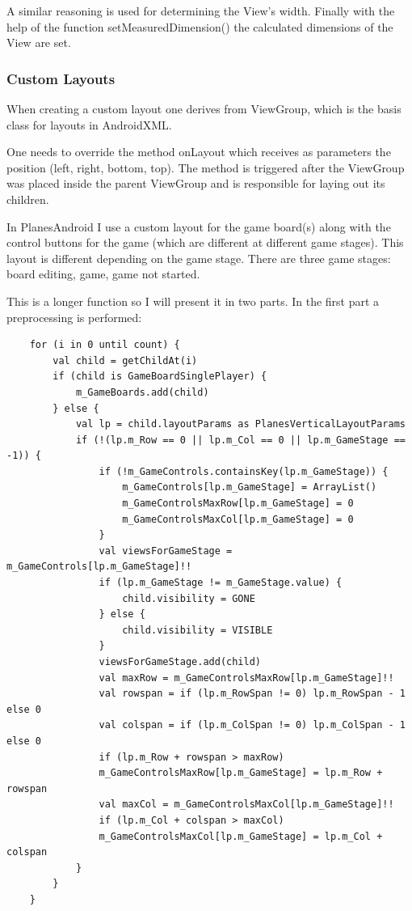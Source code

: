 A similar reasoning is used for determining the View's width. Finally with the help of the function setMeasuredDimension() the calculated dimensions of the View are set.

\subsubsection {Custom Layouts} \label{custom_layouts}

When creating a custom layout one derives from ViewGroup, which is the basis class for layouts in AndroidXML.

One needs to override the method onLayout which receives as parameters the position (left, right, bottom, top). The method is triggered after the ViewGroup was placed inside the parent ViewGroup and is responsible for laying out its children.

In PlanesAndroid I use a custom layout for the game board(s) along with the control buttons for the game (which are different at different game stages). This layout is different depending on the game stage. There are three game stages: board editing, game, game not started.

This is a longer function so I will present it in two parts. In the first part a preprocessing is performed:

\begin{lstlisting}
	for (i in 0 until count) {
		val child = getChildAt(i)
		if (child is GameBoardSinglePlayer) {
			m_GameBoards.add(child)
		} else {
			val lp = child.layoutParams as PlanesVerticalLayoutParams
			if (!(lp.m_Row == 0 || lp.m_Col == 0 || lp.m_GameStage == -1)) {
				if (!m_GameControls.containsKey(lp.m_GameStage)) {
					m_GameControls[lp.m_GameStage] = ArrayList()
					m_GameControlsMaxRow[lp.m_GameStage] = 0
					m_GameControlsMaxCol[lp.m_GameStage] = 0
				}
				val viewsForGameStage = m_GameControls[lp.m_GameStage]!!
				if (lp.m_GameStage != m_GameStage.value) {
					child.visibility = GONE
				} else {
					child.visibility = VISIBLE
				}
				viewsForGameStage.add(child)
				val maxRow = m_GameControlsMaxRow[lp.m_GameStage]!!
				val rowspan = if (lp.m_RowSpan != 0) lp.m_RowSpan - 1 else 0
				val colspan = if (lp.m_ColSpan != 0) lp.m_ColSpan - 1 else 0
				if (lp.m_Row + rowspan > maxRow)
				m_GameControlsMaxRow[lp.m_GameStage] = lp.m_Row + rowspan
				val maxCol = m_GameControlsMaxCol[lp.m_GameStage]!!
				if (lp.m_Col + colspan > maxCol)
				m_GameControlsMaxCol[lp.m_GameStage] = lp.m_Col + colspan
			}
		}
	}
\end{lstlisting}

